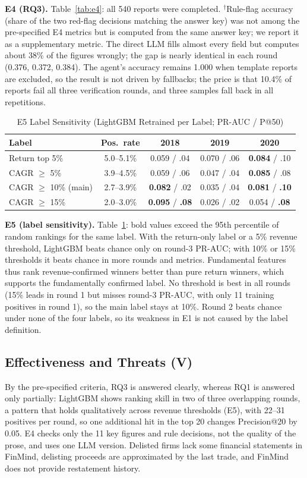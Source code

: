 \documentclass[conference]{IEEEtran}
\begin{document}
\textbf{E4 (RQ3).} Table~\ref{tab:e4}: all 540 reports were completed. $^{\dagger}$Rule-flag accuracy (share of the two red-flag decisions matching the answer key) was not among the pre-specified E4 metrics but is computed from the same answer key; we report it as a supplementary metric. The direct LLM fills almost every field but computes about 38\% of the figures wrongly; the gap is nearly identical in each round (0.376, 0.372, 0.384). The agent's accuracy remains 1.000 when template reports are excluded, so the result is not driven by fallbacks; the price is that 10.4\% of reports fail all three verification rounds, and three samples fall back in all repetitions.

\begin{table}[t]
\centering
\caption{E5 Label Sensitivity (LightGBM Retrained per Label; PR-AUC / P@50)}
\label{tab:e5}
\small
\begin{tabular}{@{}lcccc@{}}
\toprule
Label & Pos.\ rate & 2018 & 2019 & 2020 \\
\midrule
Return top 5\% & 5.0--5.1\% & 0.059 / .04 & 0.070 / .06 & \textbf{0.084} / .10 \\
CAGR $\geq$ 5\% & 3.9--4.5\% & 0.059 / .06 & 0.047 / .04 & \textbf{0.085} / .08 \\
CAGR $\geq$ 10\% (main) & 2.7--3.9\% & \textbf{0.082} / .02 & 0.035 / .04 & \textbf{0.081} / \textbf{.10} \\
CAGR $\geq$ 15\% & 2.0--3.0\% & \textbf{0.095} / \textbf{.08} & 0.026 / .02 & 0.054 / \textbf{.08} \\
\bottomrule
\end{tabular}
\end{table}

\textbf{E5 (label sensitivity).} Table~\ref{tab:e5}: bold values exceed the 95th percentile of random rankings for the same label. With the return-only label or a 5\% revenue threshold, LightGBM beats chance only on round-3 PR-AUC; with 10\% or 15\% thresholds it beats chance in more rounds and metrics. Fundamental features thus rank revenue-confirmed winners better than pure return winners, which supports the fundamentally confirmed label. No threshold is best in all rounds (15\% leads in round 1 but misses round-3 PR-AUC, with only 11 training positives in round 1), so the main label stays at 10\%. Round 2 beats chance under none of the four labels, so its weakness in E1 is not caused by the label definition.

\subsection{Effectiveness and Threats (V)}
By the pre-specified criteria, RQ3 is answered clearly, whereas RQ1 is answered only partially: LightGBM shows ranking skill in two of three overlapping rounds, a pattern that holds qualitatively across revenue thresholds (E5), with 22--31 positives per round, so one additional hit in the top 20 changes Precision@20 by 0.05. E4 checks only the 11 key figures and rule decisions, not the quality of the prose, and uses one LLM version. Delisted firms lack some financial statements in FinMind, delisting proceeds are approximated by the last trade, and FinMind does not provide restatement history.
\end{document}

